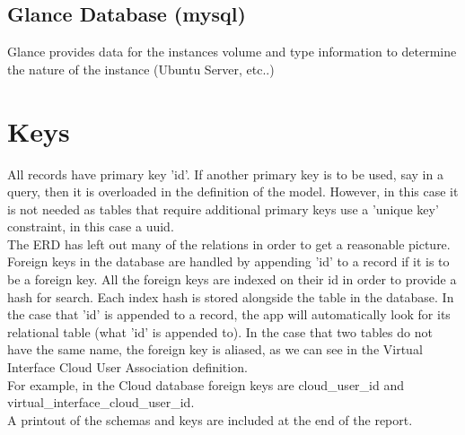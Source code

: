 \documentclass[12pt]{article}
\def\mylisting#1{{\fontsize{10}{11}\selectfont \listinginput[1]{1}{#1}}}
\def\mylisting#1{{\fontsize{10}{11}\selectfont \verbatimtabinput{#1}}}
\begin{document}
\subsection{Glance Database (mysql)}
\mylisting{glance.tables}
Glance provides data for the instances volume and type information to determine the nature of the instance (Ubuntu Server, etc..)

\section{Keys}
All records have primary key 'id'. If another primary key is to be used, say in a query, then it is overloaded in the definition of the model. However, in this case it is not needed as tables that require additional primary keys use a 'unique key' constraint, in this case a uuid.\\
The ERD has left out many of the relations in order to get a reasonable picture. Foreign keys in the database are handled by appending 'id' to a record if it is to be a foreign key. All the foreign keys are indexed on their id in order to provide a hash for search. Each index hash is stored alongside the table in the database. In the case that 'id' is appended to a record, the app will automatically look for its relational table (what 'id' is appended to). In the case that two tables do not have the same name, the foreign key is aliased, as we can see in the Virtual Interface Cloud User Association definition.\\
For example, in the Cloud database foreign keys are cloud\_user\_id and virtual\_interface\_cloud\_user\_id.\\
A printout of the schemas and keys are included at the end of the report.
\end{document}
